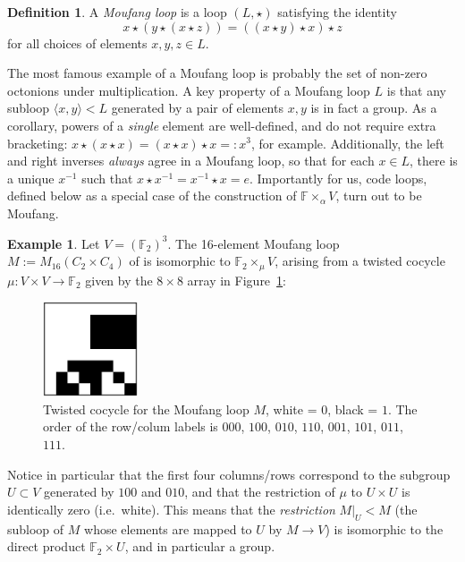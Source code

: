 \documentclass{article}
\theoremstyle{plain}
\theoremstyle{definition}
\newtheorem*{definition}{Definition}
\newtheorem{example}{Example}
\def \FF {\mathbb{F}}
\begin{document}
\begin{definition}
A \emph{Moufang loop} is a loop $(L,\star)$ satisfying the identity
\[
x \star (y \star (x \star z)) = ((x \star y) \star x) \star z
\]
for all choices of elements $x,y,z\in L$.
\end{definition}

The most famous example of a Moufang loop is probably the set of non-zero octonions under multiplication. 
A key property of a Moufang loop $L$ is that any subloop $\langle x,y\rangle < L$ generated by a pair of elements $x,y$ is in fact a group. 
As a corollary, powers of a \emph{single} element are well-defined, and do not require extra bracketing: $x\star (x \star x) = (x\star x) \star x =: x^3$, for example. 
Additionally, the left and right inverses \emph{always} agree in a Moufang loop, so that for each $x\in L$, there is a unique $x^{-1}$ such that $x\star x^{-1} = x^{-1}\star x = e$. 
Importantly for us, code loops, defined below as a special case of the construction of $\FF\times_\alpha V$, turn out to be Moufang.

\begin{example}\label{example:m16}
Let $V= (\FF_2)^3$. The 16-element Moufang loop $M := M_{16}(C_2\times C_4)$ of \cite[Theorem 2]{Chein} is isomorphic to $\FF_2 \times_\mu V$,  arising from a twisted cocycle $\mu\colon V\times V\to\FF_2$ given by the $8\times 8$ array in Figure~\ref{fig:cocycle for M}:
\medskip
\begin{figure}[!hb]
\begin{center}
\includegraphics[width=0.25\textwidth]{m16.png}
\end{center}
\caption{Twisted cocycle for the Moufang loop $M$, white = $0$, black = $1$. The order of the row/colum labels is $000$, $100$, $010$, $110$, $001$, $101$, $011$, $111$. }\label{fig:cocycle for M}
\end{figure}


Notice in particular that the first four columns/rows correspond to the subgroup $U\subset V$ generated by $100$ and $010$, and that the restriction of $\mu$ to $U\times U$ is identically zero (i.e.\ white). 
This means that the \emph{restriction} $M\big|_U < M$ (the subloop of $M$ whose elements are mapped to $U$ by $M \to V$) is isomorphic to the direct product $\FF_2\times U$, and in particular a group.
\end{example}
\end{document}
